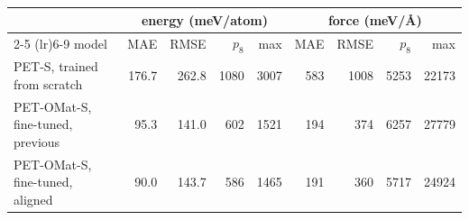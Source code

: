 \begin{tabular}{l rrrr rrrr}
\toprule
 & \multicolumn{4}{c}{energy (meV/atom)} & \multicolumn{4}{c}{force (meV/\AA{})} \\
\cmidrule(lr){2-5} \cmidrule(lr){6-9}
model & MAE & RMSE & $p_8$ & max & MAE & RMSE & $p_8$ & max \\
\midrule
PET-S, trained from scratch & 176.7 & 262.8 & 1080 & 3007 & 583 & 1008 & 5253 & 22173 \\
PET-OMat-S, fine-tuned, previous & 95.3 & 141.0 & 602 & 1521 & 194 & 374 & 6257 & 27779 \\
PET-OMat-S, fine-tuned, aligned & 90.0 & 143.7 & 586 & 1465 & 191 & 360 & 5717 & 24924 \\
\bottomrule
\end{tabular}
